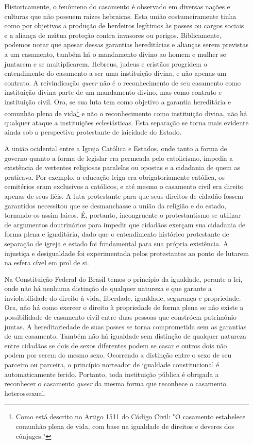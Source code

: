 \documentclass[
    article,            %
	12pt,				%
	oneside,			%
	a4paper,			%
	chapter=TITLE,		%
	section=TITLE,		%
	english,			%
	french,				%
	spanish,			%
	brazil				%
	]{abntex2}
\begin{document}
Historicamente, o fenômeno do casamento é observado em diversas nações e culturas que não possuem raízes hebraicas. Esta união costumeiramente tinha como por objetivos a produção de herdeiros legítimos às posses ou cargos sociais e a aliança de mútua proteção contra invasores ou perigos. Biblicamente, podemos notar que apesar dessas garantias hereditárias e alianças serem previstas a um casamento, também há o mandamento divino ao homem e mulher se juntarem e se multiplicarem. Hebreus, judeus e cristãos progridem o entendimento do casamento a ser uma instituição divina, e não apenas um contrato. A reivindicação \emph{queer} não é o reconhecimento de seu casamento como instituição divina parte de um mandamento divino, mas como contrato e instituição civil. Ora, se sua luta tem como objetivo a garantia hereditária e comunhão plena de vida\footnote{Como está descrito no Artigo 1511 do Código Civil: "O casamento estabelece comunhão plena de vida, com base na igualdade de direitos e deveres dos cônjuges."} e não o reconhecimento como instituição divina, não há qualquer ataque a instituições eclesiásticas. Esta separação se torna mais evidente ainda sob a perspectiva protestante de laicidade do Estado.

A união ocidental entre a Igreja Católica e Estados, onde tanto a forma de governo quanto a forma de legislar era permeada pelo catolicismo, impedia a existência de vertentes religiosas paralelas ou opostas e a cidadania de quem as praticava. Por exemplo, a educação leiga era obrigatoriamente católica, os cemitérios eram exclusivos a católicos, e até mesmo o casamento civil era direito apenas de seus fiéis. A luta protestante para que seus direitos de cidadão fossem garantidos necessitou que se desmanchasse a união da religião e do estado, tornando-os assim laicos. É, portanto, incongruente o protestantismo se utilizar de argumentos doutrinários para impedir que cidadãos exerçam sua cidadania de forma plena e igualitária, dado que o entendimento histórico protestante de separação de igreja e estado foi fundamental para sua própria existência. A injustiça e desigualdade foi experimentada pelos protestantes ao ponto de lutarem na esfera cível em prol de si.

Na Constituição Federal do Brasil temos o princípio da igualdade, perante a lei, onde não há nenhuma distinção de qualquer natureza e que garante a inviolabilidade do direito à vida, liberdade, igualdade, segurança e propriedade. Ora, não há como exercer o direito à propriedade de forma plena se não existe a possibilidade de casamento civil entre duas pessoas que constróem patrimônio juntas. A hereditariedade de suas posses se torna comprometida sem as garantias de um casamento. Também não há igualdade sem distinção de qualquer natureza entre cidadãos se dois de sexos diferentes podem se casar e outros dois não podem por serem do mesmo sexo. Ocorrendo a distinção entre o sexo de seu parceiro ou parceira, o princípio norteador de igualdade constitucional é automaticamente ferido. Portanto, toda instituição pública é obrigada a reconhecer o casamento \emph{queer} da mesma forma que reconhece o casamento heterossexual.
\end{document}
